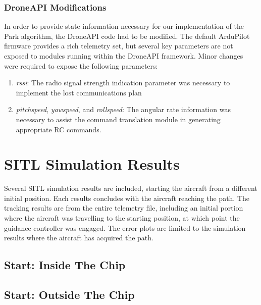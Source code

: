 \documentclass{aiaa}
\begin{document}
\subsubsection{DroneAPI Modifications}
In order to provide state information necessary for our implementation of the Park algorithm, the DroneAPI code had to be modified. The default ArduPilot firmware provides a rich telemetry set, but several key parameters are not exposed to modules running within the DroneAPI framework. Minor changes were required to expose the following parameters:
\begin{enumerate}
	\item \textit{rssi}: The radio signal strength indication parameter was necessary to implement the lost communications plan
	\item \textit{pitchspeed}, \textit{yawspeed}, and \textit{rollspeed}: The angular rate information was necessary to assist the command translation module in generating appropriate RC commands.

\end{enumerate}

\section{SITL Simulation Results}
Several SITL simulation results are included, starting the aircraft from a different initial position. Each results concludes with the aircraft reaching the path. The tracking results are from the entire telemetry file, including an initial portion where the aircraft was travelling to the starting position, at which point the guidance controller was engaged. The error plots are limited to the simulation results where the aircraft has acquired the path.
\subsection{Start: Inside The Chip}
\subsection{Start: Outside The Chip}
\end{document}
